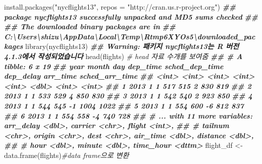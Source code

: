 \documentclass[
]{book}
\newenvironment{Shaded}{\begin{snugshade}}{\end{snugshade}}
\newcommand{\AttributeTok}[1]{\textcolor[rgb]{0.77,0.63,0.00}{#1}}
\newcommand{\CommentTok}[1]{\textcolor[rgb]{0.56,0.35,0.01}{\textit{#1}}}
\newcommand{\DocumentationTok}[1]{\textcolor[rgb]{0.56,0.35,0.01}{\textbf{\textit{#1}}}}
\newcommand{\FunctionTok}[1]{\textcolor[rgb]{0.00,0.00,0.00}{#1}}
\newcommand{\NormalTok}[1]{#1}
\newcommand{\OtherTok}[1]{\textcolor[rgb]{0.56,0.35,0.01}{#1}}
\newcommand{\StringTok}[1]{\textcolor[rgb]{0.31,0.60,0.02}{#1}}
\theoremstyle{definition}
\theoremstyle{definition}
\theoremstyle{definition}
\theoremstyle{definition}
\theoremstyle{remark}
\begin{document}
\begin{Shaded}
\begin{Highlighting}[]
\FunctionTok{install.packages}\NormalTok{(}\StringTok{"nycflights13"}\NormalTok{, }\AttributeTok{repos =} \StringTok{"http://cran.us.r{-}project.org"}\NormalTok{)}
\DocumentationTok{\#\# package \textquotesingle{}nycflights13\textquotesingle{} successfully unpacked and MD5 sums checked}
\DocumentationTok{\#\# }
\DocumentationTok{\#\# The downloaded binary packages are in}
\DocumentationTok{\#\#  C:\textbackslash{}Users\textbackslash{}shizu\textbackslash{}AppData\textbackslash{}Local\textbackslash{}Temp\textbackslash{}Rtmp6XYOs5\textbackslash{}downloaded\_packages}
\FunctionTok{library}\NormalTok{(nycflights13)}
\DocumentationTok{\#\# Warning: 패키지 \textquotesingle{}nycflights13\textquotesingle{}는 R 버전 4.1.3에서 작성되었습니다}
\FunctionTok{head}\NormalTok{(flights) }\CommentTok{\# head 자료 수개를 보여줌}
\DocumentationTok{\#\# \# A tibble: 6 x 19}
\DocumentationTok{\#\#    year month   day dep\_time sched\_dep\_time dep\_delay arr\_time sched\_arr\_time}
\DocumentationTok{\#\#   \textless{}int\textgreater{} \textless{}int\textgreater{} \textless{}int\textgreater{}    \textless{}int\textgreater{}          \textless{}int\textgreater{}     \textless{}dbl\textgreater{}    \textless{}int\textgreater{}          \textless{}int\textgreater{}}
\DocumentationTok{\#\# 1  2013     1     1      517            515         2      830            819}
\DocumentationTok{\#\# 2  2013     1     1      533            529         4      850            830}
\DocumentationTok{\#\# 3  2013     1     1      542            540         2      923            850}
\DocumentationTok{\#\# 4  2013     1     1      544            545        {-}1     1004           1022}
\DocumentationTok{\#\# 5  2013     1     1      554            600        {-}6      812            837}
\DocumentationTok{\#\# 6  2013     1     1      554            558        {-}4      740            728}
\DocumentationTok{\#\# \# ... with 11 more variables: arr\_delay \textless{}dbl\textgreater{}, carrier \textless{}chr\textgreater{}, flight \textless{}int\textgreater{},}
\DocumentationTok{\#\# \#   tailnum \textless{}chr\textgreater{}, origin \textless{}chr\textgreater{}, dest \textless{}chr\textgreater{}, air\_time \textless{}dbl\textgreater{}, distance \textless{}dbl\textgreater{},}
\DocumentationTok{\#\# \#   hour \textless{}dbl\textgreater{}, minute \textless{}dbl\textgreater{}, time\_hour \textless{}dttm\textgreater{}}
\NormalTok{flight\_df }\OtherTok{\textless{}{-}}\FunctionTok{data.frame}\NormalTok{(flights)}\CommentTok{\#data frame으로 변환}

\end{Highlighting}
\end{Shaded}
\end{document}
